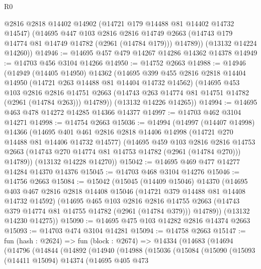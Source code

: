 \begin{lexlean}{R0}
\begin{coremodule}
        @2816
        @2818
        @14402
        @14902
        (@14721 @179 @14488 @81 @14402 @14732 @14547)
        (@14695
          @447
          @103
          @2816
          @2816
          @14749
          @2663
          (@14743 @179 @14774 @81 @14749 @14782 (@2961 (@14784 @179)))
          @14789))
      (@13132 @14224 @14260))
@14946 := @14695 @457 @479 @14267 @14286 @14362 @14378
@14949 := @14703 @456 @3104 @14266
@14950 := @14752 @2663
@14988 := @14946
    (@14949
      (@14405 @14950)
      @14362
      (@14695
        @399
        @455
        @2816
        @2818
        @14404
        @14950
        (@14721 @263 @14488 @81 @14404 @14732 @14562)
        (@14695
          @453
          @103
          @2816
          @2816
          @14751
          @2663
          (@14743 @263 @14774 @81 @14751 @14782 (@2961 (@14784 @263)))
          @14789))
      (@13132 @14226 @14265))
@14994 := @14695 @463 @478 @14272 @14285 @14366 @14377
@14997 := @14703 @462 @3104 @14271
@14998 := @14754 @2663
@15036 := @14994
    (@14997
      (@14407 @14998)
      @14366
      (@14695
        @401
        @461
        @2816
        @2818
        @14406
        @14998
        (@14721 @270 @14488 @81 @14406 @14732 @14577)
        (@14695
          @459
          @103
          @2816
          @2816
          @14753
          @2663
          (@14743 @270 @14774 @81 @14753 @14782 (@2961 (@14784 @270)))
          @14789))
      (@13132 @14228 @14270))
@15042 := @14695 @469 @477 @14277 @14284 @14370 @14376
@15045 := @14703 @468 @3104 @14276
@15046 := @14756 @2663
@15084 := @15042
    (@15045
      (@14409 @15046)
      @14370
      (@14695
        @403
        @467
        @2816
        @2818
        @14408
        @15046
        (@14721 @379 @14488 @81 @14408 @14732 @14592)
        (@14695
          @465
          @103
          @2816
          @2816
          @14755
          @2663
          (@14743 @379 @14774 @81 @14755 @14782 (@2961 (@14784 @379)))
          @14789))
      (@13132 @14230 @14275))
@15090 := @14695 @475 @103 @14282 @2816 @14374 @2663
@15093 := @14703 @474 @3104 @14281
@15094 := @14758 @2663
@15147 := fun (hash : @2624) =>
  fun (block : @2674) =>
  @14334
    (@14683
      (@14694
        (@14796
          (@14844
            (@14892
              (@14940
                (@14988
                  (@15036
                    (@15084
                      (@15090
                        (@15093
                          (@14411 @15094)
                          @14374
                          (@14695
                            @405
                            @473

\end{coremodule}
\end{lexlean}
